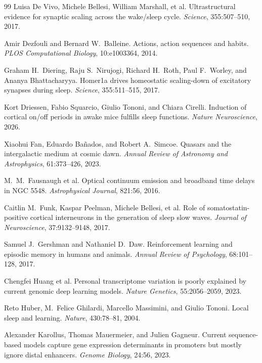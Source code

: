 \documentclass[12pt, a4paper]{article}
\theoremstyle{definition}
\begin{document}
\begin{thebibliography}{99}
Luisa De Vivo, Michele Bellesi, William Marshall, et al.
\newblock Ultrastructural evidence for synaptic scaling across the wake/sleep cycle.
\newblock \textit{Science}, 355:507--510, 2017.

Amir Dezfouli and Bernard W.\ Balleine.
\newblock Actions, action sequences and habits.
\newblock \textit{PLOS Computational Biology}, 10:e1003364, 2014.

Graham H.\ Diering, Raju S.\ Nirujogi, Richard H.\ Roth, Paul F.\ Worley, and Ananya Bhattacharyya.
\newblock Homer1a drives homeostatic scaling-down of excitatory synapses during sleep.
\newblock \textit{Science}, 355:511--515, 2017.

Kort Driessen, Fabio Squarcio, Giulio Tononi, and Chiara Cirelli.
\newblock Induction of cortical on/off periods in awake mice fulfills sleep functions.
\newblock \textit{Nature Neuroscience}, 2026.

Xiaohui Fan, Eduardo Ba\~{n}ados, and Robert A.\ Simcoe.
\newblock Quasars and the intergalactic medium at cosmic dawn.
\newblock \textit{Annual Review of Astronomy and Astrophysics}, 61:373--426, 2023.

M.\ M.\ Fausnaugh et al.
\newblock Optical continuum emission and broadband time delays in NGC 5548.
\newblock \textit{Astrophysical Journal}, 821:56, 2016.

Caitlin M.\ Funk, Kaspar Peelman, Michele Bellesi, et al.
\newblock Role of somatostatin-positive cortical interneurons in the generation of sleep slow waves.
\newblock \textit{Journal of Neuroscience}, 37:9132--9148, 2017.

Samuel J.\ Gershman and Nathaniel D.\ Daw.
\newblock Reinforcement learning and episodic memory in humans and animals.
\newblock \textit{Annual Review of Psychology}, 68:101--128, 2017.

Chengfei Huang et al.
\newblock Personal transcriptome variation is poorly explained by current genomic deep learning models.
\newblock \textit{Nature Genetics}, 55:2056--2059, 2023.

Reto Huber, M.\ Felice Ghilardi, Marcello Massimini, and Giulio Tononi.
\newblock Local sleep and learning.
\newblock \textit{Nature}, 430:78--81, 2004.

Alexander Karollus, Thomas Mauermeier, and Julien Gagneur.
\newblock Current sequence-based models capture gene expression determinants in promoters but mostly ignore distal enhancers.
\newblock \textit{Genome Biology}, 24:56, 2023.


\end{thebibliography}
\end{document}

